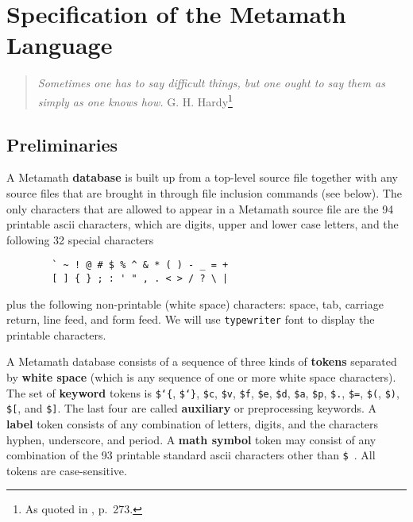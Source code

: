 \section{Specification of the Metamath Language}\label{spec}

\begin{quote}
  {\em Sometimes one has to say difficult things, but one ought to say
them as simply as one knows how.}
    \flushright\sc  G. H. Hardy\footnote{As quoted in
    \cite{deMillo}, p.~273.}\\
\end{quote}

\subsection{Preliminaries}\label{spec1}

A Metamath {\bf database} is built up from a top-level source
file together with any source files that are brought in through file inclusion
commands (see below).  The only characters that are allowed to appear in a
Metamath source file are the 94 printable {\sc
ascii} characters, which are digits, upper and lower
case letters, and the following 32 special characters
\label{spec1chars}

\begin{verbatim}
        ` ~ ! @ # $ % ^ & * ( ) - _ = +
        [ ] { } ; : ' " , . < > / ? \ |
\end{verbatim}
plus the following non-printable (white space) characters: space, tab,
carriage return, line feed, and form feed.  We will use \texttt{typewriter}
font to display the printable characters.

A Metamath database consists of a sequence of three kinds of {\bf
tokens} separated by {\bf white space}
(which is any sequence of one or more white space characters).  The set
of {\bf keyword} tokens is \texttt{\$\char`\{},
\texttt{\$\char`\}}, \texttt{\$c}, \texttt{\$v}, \texttt{\$f},
\texttt{\$e}, \texttt{\$d}, \texttt{\$a}, \texttt{\$p}, \texttt{\$.},
\texttt{\$=}, \texttt{\$(}, \texttt{\$)}, \texttt{\$[}, and
\texttt{\$]}.  The last four are called {\bf auxiliary} or preprocessing keywords.  A {\bf label} token
consists of any combination of letters, digits, and the characters
hyphen, underscore, and period.  A {\bf math symbol}
token may consist of any combination of the 93 printable standard {\sc
ascii} characters other than \texttt{\$}~. All tokens are
case-sensitive.

